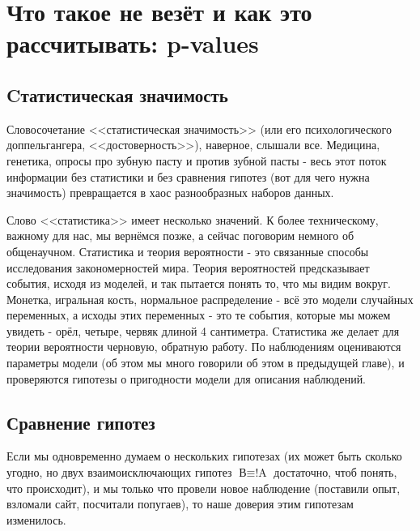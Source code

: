 \documentclass{book}
\begin{document}

\chapter[Что такое не везёт: p-values]{Что такое не везёт и как это рассчитывать: p-values}

\section*{Cтатистическая значимость}

Словосочетание <<статистическая значимость>> (или его психологического доппельгангера, <<достоверность>>), наверное, слышали все. Медицина, генетика, опросы про зубную пасту и против зубной пасты - весь этот поток информации без статистики и без сравнения гипотез (вот для чего нужна значимость) превращается в хаос разнообразных наборов данных.

Слово <<статистика>> имеет несколько значений. К более техническому, важному для нас, мы вернёмся позже, а сейчас поговорим немного об общенаучном. Статистика и теория вероятности - это связанные способы исследования закономерностей мира. Теория вероятностей предсказывает события, исходя из моделей, и так пытается понять то, что мы видим вокруг. Монетка, игральная кость, нормальное распределение - всё это модели случайных переменных, а исходы этих переменных - это те события, которые мы можем увидеть - орёл, четыре, червяк длиной 4 сантиметра. Статистика же делает для теории вероятности черновую, обратную работу. По наблюдениям оцениваются параметры модели (об этом мы много говорили об этом в предыдущей главе), и проверяются гипотезы о пригодности модели для описания наблюдений. 

\section*{Сравнение гипотез}

Если мы одновременно думаем о нескольких гипотезах (их может быть сколько угодно, но двух взаимоисключающих гипотез $\text{В} \equiv \text{!A}$ достаточно, чтоб понять, что происходит), и мы только что провели новое наблюдение  (поставили опыт, взломали сайт, посчитали попугаев), то наше доверия этим гипотезам изменилось.  
\end{document}
